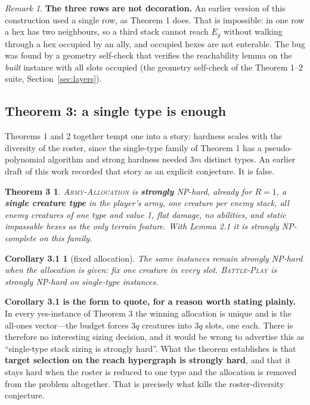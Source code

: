 \documentclass[11pt,a4paper]{article}
\theoremstyle{plain}
\newtheorem*{thmthree}{Theorem 3}
\newtheorem*{corthree}{Corollary 3.1}
\theoremstyle{definition}
\theoremstyle{plain}
\theoremstyle{definition}
\theoremstyle{remark}
\newtheorem*{remark}{Remark}
\newcommand{\ALLOC}{\textsc{Army-Allocation}}
\newcommand{\PLAY}{\textsc{Battle-Play}}
\begin{document}
\begin{remark}
\textbf{The three rows are not decoration.} An earlier version of this construction used a
single row, as Theorem 1 does. That is impossible: in one row a hex has two neighbours, so a
third stack cannot reach $E_g$ without walking through a hex occupied by an ally, and occupied
hexes are not enterable. The bug was found by a geometry self-check that verifies the
reachability lemma on the \emph{built} instance with all slots occupied (the geometry
self-check of the Theorem 1--2 suite, Section~\ref{sec:layers}).
\end{remark}

\subsection{Theorem 3: a single type is enough}\label{sec:thm3}

Theorems 1 and 2 together tempt one into a story: hardness scales with the diversity of the
roster, since the single-type family of Theorem 1 has a pseudo-polynomial algorithm and strong
hardness needed $3m$ distinct types. An earlier draft of this work recorded that story as an
explicit conjecture. It is false.

\begin{thmthree}
\ALLOC{} is \textbf{strongly} NP-hard, already for $R=1$, a \textbf{single creature type} in
the player's army, one creature per enemy stack, all enemy creatures of one type and value 1,
flat damage, no abilities, and static impassable hexes as the only terrain feature. With
Lemma 2.1 it is strongly NP-complete on this family.
\end{thmthree}

\begin{corthree}[fixed allocation]
The same instances remain strongly NP-hard when the allocation is given: fix one creature in
every slot. \PLAY{} is strongly NP-hard on single-type instances.
\end{corthree}

\noindent\textbf{Corollary 3.1 is the form to quote, for a reason worth stating plainly.} In
every yes-instance of Theorem 3 the winning allocation is unique and is the all-ones
vector---the budget forces $3q$ creatures into $3q$ slots, one each. There is therefore no
interesting sizing decision, and it would be wrong to advertise this as ``single-type stack
sizing is strongly hard''. What the theorem establishes is that \textbf{target selection on the
reach hypergraph is strongly hard}, and that it stays hard when the roster is reduced to one
type and the allocation is removed from the problem altogether. That is precisely what kills
the roster-diversity conjecture.
\end{document}
